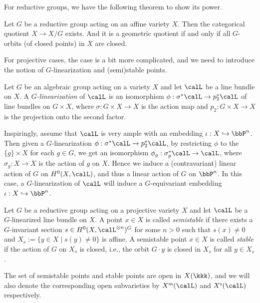 For reductive groups, we have the following theorem to show its power.

\begin{theorem}
	Let $G$ be a reductive group acting on an affine variety $X$.
	Then the categorical quotient $X \to X / G$ exists.
	And it is a geometric quotient if and only if all $G$-orbits (of closed points) in $X$ are closed.
\end{theorem}

For projective cases, the case is a bit more complicated, and we need to introduce the notion of $G$-linearization and (semi)stable points.

\begin{definition}
	Let $G$ be an algebraic group acting on a variety $X$ and let $\calL$ be a line bundle on $X$.
	A \emph{$G$-linearization} of $\calL$ is an isomorphism $\phi: \sigma^* \calL \to p_2^* \calL$ of line bundles on $G \times X$, where $\sigma: G \times X \to X$ is the action map and $p_2: G \times X \to X$ is the projection onto the second factor.
\end{definition}

Inspiringly, assume that $\calL$ is very ample with an embedding $\iota: X \hookrightarrow \bbP^n$.
Then given a $G$-linearization $\phi: \sigma^* \calL \to p_2^* \calL$, by restricting $\phi$ to the $\{g\} \times X$ for each $g \in G$, we get an isomorphism $\phi_g: \sigma_g^* \calL \to \calL$, where $\sigma_g: X \to X$ is the action of $g$ on $X$.
Hence we induce a (contravariant) linear action of $G$ on $H^0(X, \calL)$, and thus a linear action of $G$ on $\bbP^n$.
In this case, a $G$-linearization of $\calL$ will induce a $G$-equivariant embedding $\iota: X \hookrightarrow \bbP^n$.

\begin{definition}
	Let $G$ be a reductive group acting on a projective variety $X$ and let $\calL$ be a $G$-linearized line bundle on $X$.
	A point $x \in X$ is called \emph{semistable} if there exists a $G$-invariant section $s \in H^0(X, \calL^{\otimes n})^G$ for some $n > 0$ such that $s(x) \neq 0$ and $X_s := \{y \in X \mid s(y) \neq 0\}$ is affine.
	A semistable point $x \in X$ is called \emph{stable} if the action of $G$ on $X_s$ is closed, i.e., the orbit $G \cdot y$ is closed in $X_s$ for all $y \in X_s$.
\end{definition}

The set of semistable points and stable points are open in $X(\kkk)$, and we will also denote the corresponding open subvarieties by $X^{\text{ss}}(\calL)$ and $X^{\text{s}}(\calL)$ respectively.

